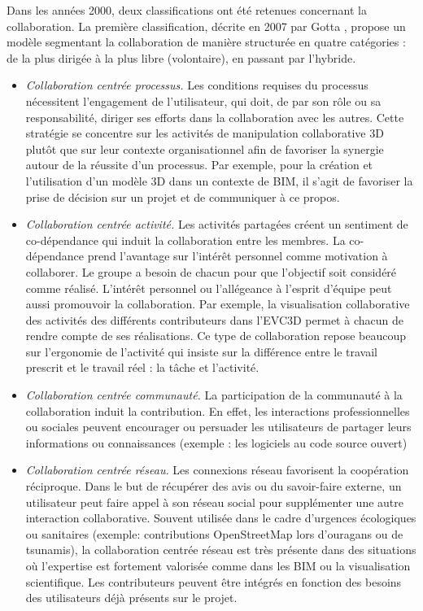 Dans les années 2000, deux classifications ont été retenues concernant la 
collaboration.
La première classification, décrite en 2007 par Gotta \cite{Gotta2007}, propose 
un modèle segmentant la collaboration de manière structurée en quatre catégories 
: de la plus dirigée à la plus libre (volontaire), en passant par l'hybride.
\begin{itemize}
	\item \textit{Collaboration centrée processus.} Les conditions requises du 
	processus 
	nécessitent l'engagement de l'utilisateur, qui doit, de par son rôle ou sa 
	responsabilité, diriger ses efforts dans la collaboration avec les autres. Cette 
	stratégie se concentre sur les activités de manipulation collaborative \gls{3D} 
	plutôt que sur leur contexte organisationnel afin de favoriser la synergie autour de la 
	réussite d'un processus. Par exemple, pour la création et l'utilisation d'un 
	modèle 	3D dans un contexte de \gls{BIM}, il s'agit de favoriser la prise de décision sur un 
	projet et de communiquer à ce propos.
	
	\item \textit{Collaboration centrée activité.}
	Les activités partagées créent un sentiment de co-dé\-pendance qui induit la 
	collaboration entre les membres. La co-dépendance prend l'avantage sur l'intérêt personnel comme motivation à collaborer. Le groupe a besoin 
	de chacun pour que l'objectif soit considéré comme réalisé. L'intérêt personnel 
	ou l'allégeance à l'esprit d'équipe peut aussi promouvoir la collaboration. Par 
	exemple, la visualisation collaborative des activités des différents contributeurs 
	dans l'\gls{EVC3D} permet à chacun de rendre compte de ses réalisations. Ce 
	type de collaboration repose beaucoup sur l'ergonomie de l'activité qui insiste sur la 
	différence entre le travail prescrit et le travail réel : la tâche et l'activité.
	
	\item \textit{Collaboration centrée communauté.}
	La participation de la communauté à la collaboration induit la contribution. En 
	effet, les interactions professionnelles ou sociales peuvent encourager ou 
	persuader les utilisateurs de partager leurs informations ou connaissances 
	(exemple : les logiciels au code source ouvert)
	
	\item \textit{Collaboration centrée réseau.}
	Les connexions réseau favorisent la coopération réciproque. Dans le but de 
	récupérer des avis ou du savoir-faire externe, un utilisateur peut faire appel à 
	son réseau social pour supplémenter une autre interaction collaborative. 
	Souvent utilisée dans le cadre d'urgences écologiques ou sanitaires (exemple: 
	contributions OpenStreetMap lors d'ouragans ou de tsunamis), la collaboration 
	centrée réseau est très présente dans des situations où l'expertise est 
	fortement valorisée comme dans les \gls{BIM} ou la visualisation scientifique. Les 
	contributeurs peuvent être intégrés en fonction des besoins des utilisateurs déjà 
	présents sur le projet.
\end{itemize}
